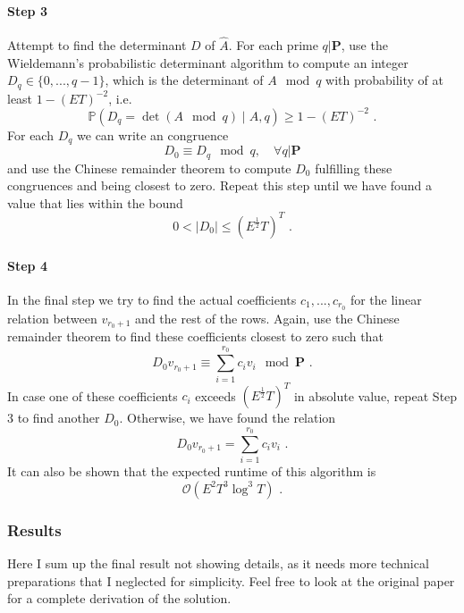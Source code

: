 \documentclass[paper=a4, fontsize=11pt]{scrartcl} %
\numberwithin{equation}{section} %
\numberwithin{figure}{section} %
\numberwithin{table}{section} %
\begin{document}
\paragraph{Step 3} Attempt to find the determinant $D$ of $\hat{A}$. For each prime $q|\boldsymbol{P}$, use the Wieldemann's probabilistic determinant algorithm \citep{wiedemann1986solving} to compute an integer $D_q\in\{0,...,q-1\}$, which is the determinant of $A\mod q$ with probability of at least $1-(ET)^{-2}$, i.e.
\begin{equation}
\mathbb{P}(D_q = \det(A\mod q)\mid A,q) \geq 1-(ET)^{-2}
\text{ .}
\end{equation}
For each $D_q$ we can write an congruence
\begin{equation}
D_0 \equiv D_q \mod q,\quad\forall q|\boldsymbol{P}
\end{equation}
and use the Chinese remainder theorem to compute $D_0$ fulfilling these congruences and being closest to zero. Repeat this step until we have found a value that lies within the bound
\begin{equation}
0 < |D_0| \leq (E^{\frac{1}{2}}T)^T
\text{ .}
\end{equation}

\paragraph{Step 4} In the final step we try to find the actual coefficients $c_1,...,c_{r_0}$ for the linear relation between $v_{r_0+1}$ and the rest of the rows. Again, use the Chinese remainder theorem to find these coefficients closest to zero such that
\begin{equation}
D_0v_{r_0+1}\equiv\sum_{i=1}^{r_0}c_iv_i\mod\boldsymbol{P}
\text{ .}
\end{equation}
In case one of these coefficients $c_i$ exceeds $(E^{\frac{1}{2}}T)^T$ in absolute value, repeat Step 3 to find another $D_0$. Otherwise, we have found the relation
\begin{equation}
D_0v_{r_0+1}=\sum_{i=1}^{r_0}c_iv_i
\text{ .}
\end{equation}
It can also be shown that the expected runtime of this algorithm is
\begin{equation}
\mathcal{O}(E^2T^3\log^3T)
\text{ .}
\end{equation}

\subsubsection{Results}
Here I sum up the final result not showing details, as it needs more technical preparations that I neglected for simplicity. Feel free to look at the original paper for a complete derivation of the solution.
\end{document}
